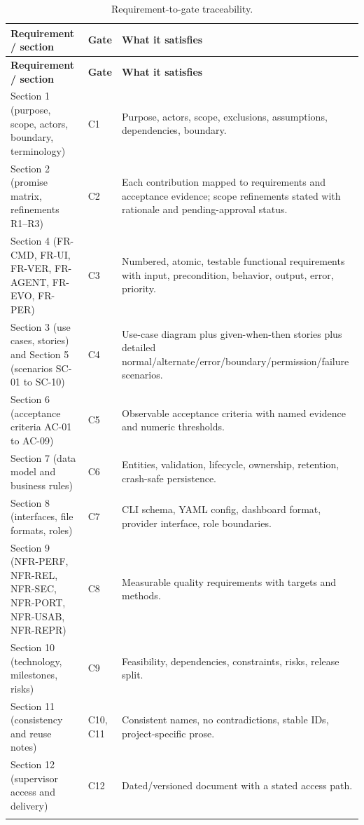 \documentclass[12pt,a4paper]{article}
\begin{document}
\begin{center}
\footnotesize
\setlength{\tabcolsep}{4pt}
\begin{longtable}{@{}p{4.4cm}p{2.2cm}p{6.2cm}@{}}
\toprule
\textbf{Requirement / section} & \textbf{Gate} & \textbf{What it satisfies} \\
\midrule
\endfirsthead
\toprule
\textbf{Requirement / section} & \textbf{Gate} & \textbf{What it satisfies} \\
\midrule
\endhead
\bottomrule
\endfoot

Section 1 (purpose, scope, actors, boundary, terminology) & C1 & Purpose, actors, scope, exclusions, assumptions, dependencies, boundary. \\
\addlinespace[2pt]
Section 2 (promise matrix, refinements R1--R3) & C2 & Each contribution mapped to requirements and acceptance evidence; scope refinements stated with rationale and pending-approval status. \\
\addlinespace[2pt]
Section 4 (FR-CMD, FR-UI, FR-VER, FR-AGENT, FR-EVO, FR-PER) & C3 & Numbered, atomic, testable functional requirements with input, precondition, behavior, output, error, priority. \\
\addlinespace[2pt]
Section 3 (use cases, stories) and Section 5 (scenarios SC-01 to SC-10) & C4 & Use-case diagram plus given-when-then stories plus detailed normal/alternate/error/boundary/permission/failure scenarios. \\
\addlinespace[2pt]
Section 6 (acceptance criteria AC-01 to AC-09) & C5 & Observable acceptance criteria with named evidence and numeric thresholds. \\
\addlinespace[2pt]
Section 7 (data model and business rules) & C6 & Entities, validation, lifecycle, ownership, retention, crash-safe persistence. \\
\addlinespace[2pt]
Section 8 (interfaces, file formats, roles) & C7 & CLI schema, YAML config, dashboard format, provider interface, role boundaries. \\
\addlinespace[2pt]
Section 9 (NFR-PERF, NFR-REL, NFR-SEC, NFR-PORT, NFR-USAB, NFR-REPR) & C8 & Measurable quality requirements with targets and methods. \\
\addlinespace[2pt]
Section 10 (technology, milestones, risks) & C9 & Feasibility, dependencies, constraints, risks, release split. \\
\addlinespace[2pt]
Section 11 (consistency and reuse notes) & C10, C11 & Consistent names, no contradictions, stable IDs, project-specific prose. \\
\addlinespace[2pt]
Section 12 (supervisor access and delivery) & C12 & Dated/versioned document with a stated access path. \\
\bottomrule
\caption{Requirement-to-gate traceability.}
\label{tab:gate}
\end{longtable}
\end{center}
\end{document}
